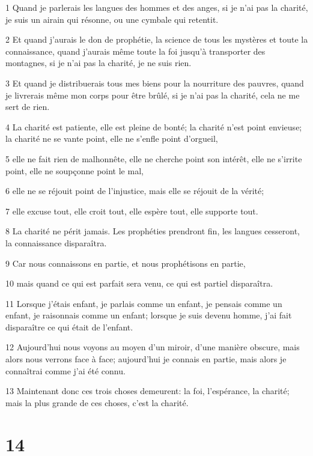 \par 1 Quand je parlerais les langues des hommes et des anges, si je n'ai pas la charité, je suis un airain qui résonne, ou une cymbale qui retentit.
\par 2 Et quand j'aurais le don de prophétie, la science de tous les mystères et toute la connaissance, quand j'aurais même toute la foi jusqu'à transporter des montagnes, si je n'ai pas la charité, je ne suis rien.
\par 3 Et quand je distribuerais tous mes biens pour la nourriture des pauvres, quand je livrerais même mon corps pour être brûlé, si je n'ai pas la charité, cela ne me sert de rien.
\par 4 La charité est patiente, elle est pleine de bonté; la charité n'est point envieuse; la charité ne se vante point, elle ne s'enfle point d'orgueil,
\par 5 elle ne fait rien de malhonnête, elle ne cherche point son intérêt, elle ne s'irrite point, elle ne soupçonne point le mal,
\par 6 elle ne se réjouit point de l'injustice, mais elle se réjouit de la vérité;
\par 7 elle excuse tout, elle croit tout, elle espère tout, elle supporte tout.
\par 8 La charité ne périt jamais. Les prophéties prendront fin, les langues cesseront, la connaissance disparaîtra.
\par 9 Car nous connaissons en partie, et nous prophétisons en partie,
\par 10 mais quand ce qui est parfait sera venu, ce qui est partiel disparaîtra.
\par 11 Lorsque j'étais enfant, je parlais comme un enfant, je pensais comme un enfant, je raisonnais comme un enfant; lorsque je suis devenu homme, j'ai fait disparaître ce qui était de l'enfant.
\par 12 Aujourd'hui nous voyons au moyen d'un miroir, d'une manière obscure, mais alors nous verrons face à face; aujourd'hui je connais en partie, mais alors je connaîtrai comme j'ai été connu.
\par 13 Maintenant donc ces trois choses demeurent: la foi, l'espérance, la charité; mais la plus grande de ces choses, c'est la charité.

\chapter{14}


